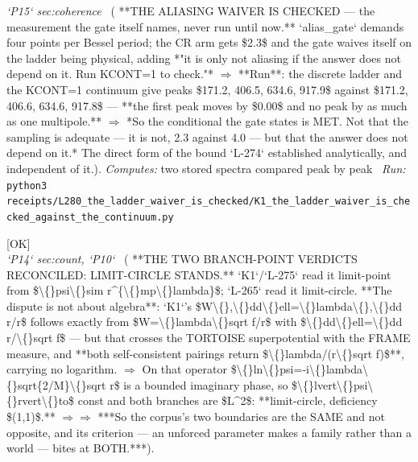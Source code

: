 \begin{description}
\textit{`P15` sec:coherence} \ ( **THE ALIASING WAIVER IS CHECKED --- the measurement the gate itself names, never run until now.** `alias\_gate` demands four points per Bessel period; the CR arm gets \$2.3\$ and the gate waives itself on the ladder being physical, adding *"it is only not aliasing if the answer does not depend on it. Run KCONT=1 to check."* \ensuremath{\Rightarrow} **Run**: the discrete ladder and the KCONT=1 continuum give peaks \$171.2, 406.5, 634.6, 917.9\$ against \$171.2, 406.6, 634.6, 917.8\$ --- **the first peak moves by \$0.00\$ and no peak by as much as one multipole.** \ensuremath{\Rightarrow} *So the conditional the gate states is MET. Not that the sampling is adequate --- it is not, 2.3 against 4.0 --- but that the answer does not depend on it.*  The direct form of the bound `L-274` established analytically, and independent of it.). 
\emph{Computes:} two stored spectra compared peak by peak
\ \emph{Run:} \texttt{python3 receipts/L280\_the\_ladder\_waiver\_is\_checked/K1\_the\_ladder\_waiver\_is\_checked\_against\_the\_continuum.py}
\item[\label{rcpt:V1_both_self_consistent_pairings_give_limit_circle}\texttt{V1\_both\_self\_consistent\_pairings\_give\_limit\_circle}]\hfill\textsf{[OK]}\\
\textit{`P14` sec:count, `P10`} \ ( **THE TWO BRANCH-POINT VERDICTS RECONCILED: LIMIT-CIRCLE STANDS.** `K1`/`L-275` read it limit-point from \$\textbackslash\{\}psi\textbackslash\{\}sim r\textasciicircum{}\{\textbackslash\{\}mp\textbackslash\{\}lambda\}\$; `L-265` read it limit-circle. **The dispute is not about algebra**: `K1`'s \$W\textbackslash\{\},\textbackslash\{\}dd\textbackslash\{\}ell=\textbackslash\{\}lambda\textbackslash\{\},\textbackslash\{\}dd r/r\$ follows exactly from \$W=\textbackslash\{\}lambda\textbackslash\{\}sqrt f/r\$ with \$\textbackslash\{\}dd\textbackslash\{\}ell=\textbackslash\{\}dd r/\textbackslash\{\}sqrt f\$ --- but that crosses the TORTOISE superpotential with the FRAME measure, and **both self-consistent pairings return \$\textbackslash\{\}lambda/(r\textbackslash\{\}sqrt f)\$**, carrying no logarithm. \ensuremath{\Rightarrow} On that operator \$\textbackslash\{\}ln\textbackslash\{\}psi=-i\textbackslash\{\}lambda\textbackslash\{\}sqrt\{2/M\}\textbackslash\{\}sqrt r\$ is a bounded imaginary phase, so \$\textbackslash\{\}lvert\textbackslash\{\}psi\textbackslash\{\}rvert\textbackslash\{\}to\$ const and both branches are \$L\textasciicircum{}2\$: **limit-circle, deficiency \$(1,1)\$.** \ensuremath{\Rightarrow}\ensuremath{\Rightarrow} ***So the corpus's two boundaries are the SAME and not opposite, and its criterion --- an unforced parameter makes a family rather than a world --- bites at BOTH.***). 

\end{description}
